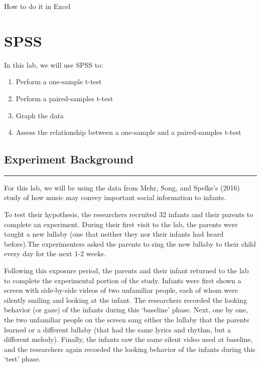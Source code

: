 \documentclass[]{book}
\providecommand{\tightlist}{%
  \setlength{\itemsep}{0pt}\setlength{\parskip}{0pt}}
\begin{document}
How to do it in Excel

\section{SPSS}\label{spss-6}

In this lab, we will use SPSS to:

\begin{enumerate}
\def\labelenumi{\arabic{enumi}.}
\tightlist
\item
  Perform a one-sample t-test
\item
  Perform a paired-samples t-test
\item
  Graph the data
\item
  Assess the relationship between a one-sample and a paired-samples
  t-test
\end{enumerate}

\subsection{Experiment Background}\label{experiment-background-1}

\begin{center}\rule{0.5\linewidth}{0.5pt}\end{center}

For this lab, we will be using the data from Mehr, Song, and Spelke's
(2016) study of how music may convey important social information to
infants.

To test their hypothesis, the researchers recruited 32 infants and their
parents to complete an experiment. During their first visit to the lab,
the parents were taught a new lullaby (one that neither they nor their
infants had heard before).The experimenters asked the parents to sing
the new lullaby to their child every day for the next 1-2 weeks.

Following this exposure period, the parents and their infant returned to
the lab to complete the experimental portion of the study. Infants were
first shown a screen with side-by-side videos of two unfamiliar people,
each of whom were silently smiling and looking at the infant. The
researchers recorded the looking behavior (or gaze) of the infants
during this `baseline' phase. Next, one by one, the two unfamiliar
people on the screen sang either the lullaby that the parents learned or
a different lullaby (that had the same lyrics and rhythm, but a
different melody). Finally, the infants saw the same silent video used
at baseline, and the researchers again recorded the looking behavior of
the infants during this `test' phase.
\end{document}
